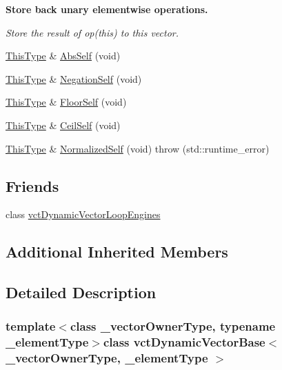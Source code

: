 \begin{Indent}{\bf Store back unary elementwise operations.}\par
{\em Store the result of op(this) to this vector. }\begin{DoxyCompactItemize}
\item 
\hyperlink{classvct_dynamic_const_vector_base_a39da273523717f678f54d3321ebca3dd}{This\-Type} \& \hyperlink{classvct_dynamic_vector_base_ab3c44e0d5224cf4f2dec1d506ab6c604}{Abs\-Self} (void)
\item 
\hyperlink{classvct_dynamic_const_vector_base_a39da273523717f678f54d3321ebca3dd}{This\-Type} \& \hyperlink{classvct_dynamic_vector_base_a569459da915ad59245304445ae699782}{Negation\-Self} (void)
\item 
\hyperlink{classvct_dynamic_const_vector_base_a39da273523717f678f54d3321ebca3dd}{This\-Type} \& \hyperlink{classvct_dynamic_vector_base_ab900e7960dbd3dbf857673ed27f29cb2}{Floor\-Self} (void)
\item 
\hyperlink{classvct_dynamic_const_vector_base_a39da273523717f678f54d3321ebca3dd}{This\-Type} \& \hyperlink{classvct_dynamic_vector_base_a8ffae784a033f6595e133d4c4abe6b39}{Ceil\-Self} (void)
\item 
\hyperlink{classvct_dynamic_const_vector_base_a39da273523717f678f54d3321ebca3dd}{This\-Type} \& \hyperlink{classvct_dynamic_vector_base_a9e20a5576c634ae993c7eca4c35aab98}{Normalized\-Self} (void)  throw (std\-::runtime\-\_\-error)
\end{DoxyCompactItemize}
\end{Indent}
\subsection*{Friends}
\begin{DoxyCompactItemize}
\item 
class \hyperlink{classvct_dynamic_vector_base_af017ae93f1ac2b0bb0431a0aedb79ca1}{vct\-Dynamic\-Vector\-Loop\-Engines}
\end{DoxyCompactItemize}
\subsection*{Additional Inherited Members}


\subsection{Detailed Description}
\subsubsection*{template$<$class \-\_\-vector\-Owner\-Type, typename \-\_\-element\-Type$>$class vct\-Dynamic\-Vector\-Base$<$ \-\_\-vector\-Owner\-Type, \-\_\-element\-Type $>$}

